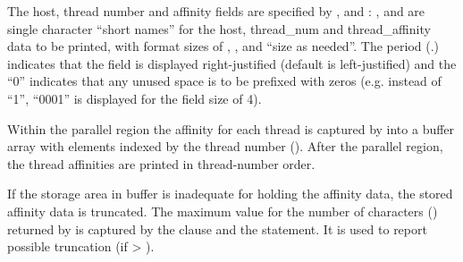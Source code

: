 The host, thread number and affinity fields are specified by , 
 and : ,  and  are single character ``short names''
for the host, thread\_num and thread\_affinity data to be printed,
with format sizes of , , and ``size as needed''.
The period (.) indicates that the field is displayed right-justified (default is left-justified) 
and the ``0'' indicates that any unused space is to be prefixed with zeros
(e.g. instead of ``1'', ``0001'' is displayed for the field size of 4).

Within the parallel region the affinity for each thread is captured by 
 into a buffer array with elements indexed 
by the thread number ().
After the parallel region, the thread affinities are printed in thread-number order.

If the storage area in buffer is inadequate for holding the affinity
data, the stored affinity data is truncated.  
The maximum value for the number of characters () returned by 
 is captured by the 
clause and the  statement. 
It is used to report possible truncation (if  > ).

\pagebreak
{}


